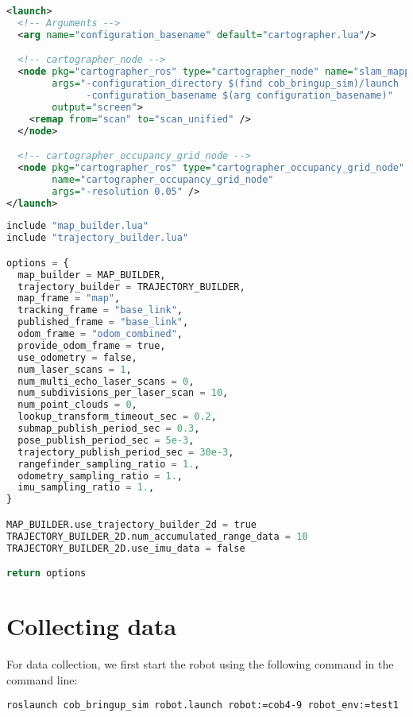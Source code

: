 \begin{lstlisting}[caption={Cartographer launch file.},label={lst:cartographer},language=XML]
<launch>
  <!-- Arguments -->
  <arg name="configuration_basename" default="cartographer.lua"/>

  <!-- cartographer_node -->
  <node pkg="cartographer_ros" type="cartographer_node" name="slam_mapping"
        args="-configuration_directory $(find cob_bringup_sim)/launch
              -configuration_basename $(arg configuration_basename)"
        output="screen">
    <remap from="scan" to="scan_unified" />
  </node>

  <!-- cartographer_occupancy_grid_node -->
  <node pkg="cartographer_ros" type="cartographer_occupancy_grid_node"
        name="cartographer_occupancy_grid_node"
        args="-resolution 0.05" />
</launch>
\end{lstlisting}

\begin{lstlisting}[caption={Cartographer Lua configuration.},label={lst:cartographer_lua},language=Python]
include "map_builder.lua"
include "trajectory_builder.lua"

options = {
  map_builder = MAP_BUILDER,
  trajectory_builder = TRAJECTORY_BUILDER,
  map_frame = "map",
  tracking_frame = "base_link",
  published_frame = "base_link",
  odom_frame = "odom_combined",
  provide_odom_frame = true,
  use_odometry = false,
  num_laser_scans = 1,
  num_multi_echo_laser_scans = 0,
  num_subdivisions_per_laser_scan = 10,
  num_point_clouds = 0,
  lookup_transform_timeout_sec = 0.2,
  submap_publish_period_sec = 0.3,
  pose_publish_period_sec = 5e-3,
  trajectory_publish_period_sec = 30e-3,
  rangefinder_sampling_ratio = 1.,
  odometry_sampling_ratio = 1.,
  imu_sampling_ratio = 1.,
}

MAP_BUILDER.use_trajectory_builder_2d = true
TRAJECTORY_BUILDER_2D.num_accumulated_range_data = 10
TRAJECTORY_BUILDER_2D.use_imu_data = false

return options
\end{lstlisting}

\section{Collecting data} \label{sec:collecting_data}

For data collection, we first start the robot using the following command in the command line:

\begin{verbatim}
roslaunch cob_bringup_sim robot.launch robot:=cob4-9 robot_env:=test1
\end{verbatim}

